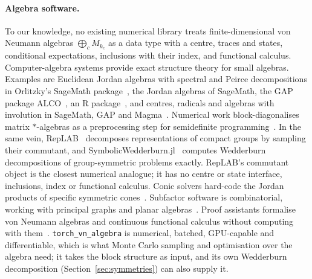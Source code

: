 \documentclass[11pt]{article}
\begin{document}
\paragraph{Algebra software.} %
To our knowledge, no existing numerical library treats finite-dimensional von Neumann algebras $\bigoplus_cM_{k_c}$
as a data type with a centre, traces and states, conditional expectations, inclusions with their index, and functional
calculus. Computer-algebra systems provide exact structure theory for small algebras. Examples are Euclidean Jordan
algebras with spectral and Peirce decompositions in Orlitzky's SageMath package~\cite{orlitzky2022}, the Jordan
algebras of SageMath, the GAP package ALCO~\cite{alco}, an R package~\cite{hankin2023}, and centres, radicals and
algebras with involution in SageMath, GAP and Magma~\cite{brooksbank2012}. Numerical work block-diagonalises matrix
$*$-algebras as a preprocessing step for semidefinite
programming~\cite{murota2010,maehara2010,deklerk2011,permenter2020}. In the same vein, RepLAB~\cite{rosset2021}
decomposes representations of compact groups by sampling their commutant, and SymbolicWedderburn.jl~\cite{symbolicwedderburn}
computes Wedderburn decompositions of group-symmetric problems exactly. RepLAB's commutant object is the closest
numerical analogue; it has no centre or state interface, inclusions, index or functional calculus. Conic solvers
hard-code the Jordan products of specific symmetric cones~\cite{goulart2026,coey2023}. Subfactor software is
combinatorial, working with principal graphs and planar algebras~\cite{morrison2012,jones2014}. Proof assistants
formalise von Neumann algebras and continuous functional calculus without computing with them~\cite{dedecker2025}.
\texttt{torch\_vn\_algebra} is numerical, batched, GPU-capable and differentiable, which is what Monte Carlo sampling
and optimisation over the algebra need; it takes the block structure as input, and its own Wedderburn decomposition
(Section~\ref{sec:symmetries}) can also supply it.
\end{document}
